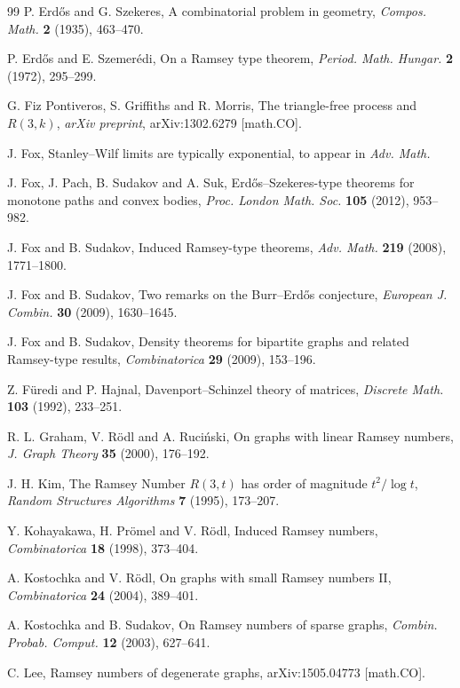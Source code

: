 \documentclass[11pt]{article}
\begin{document}
\begin{thebibliography}{99}
P. Erd\H{o}s and G. Szekeres, A combinatorial problem in geometry, {\it Compos. Math.} {\bf 2} (1935), 463--470.

{P. Erd\H{o}s and E. Szemer\'edi,} {On a Ramsey type theorem,} {\it Period. Math. Hungar.} {\bf 2} (1972), 295--299.

{G. Fiz Pontiveros, S. Griffiths and R. Morris,} {The triangle-free process and $R(3,k)$,} {\it arXiv preprint}, arXiv:1302.6279 [math.CO].

J. Fox, Stanley--Wilf limits are typically exponential, to appear in {\it Adv. Math.}

 J. Fox, J. Pach, B. Sudakov and A. Suk, Erd\H{o}s--Szekeres-type theorems for monotone paths and convex bodies,  {\it Proc. London Math. Soc.} {\bf 105} (2012), 953--982. 

J. Fox and B. Sudakov, Induced Ramsey-type theorems, {\it Adv. Math.} {\bf 219} (2008), 1771--1800.

J. Fox and B. Sudakov, Two remarks on the Burr--Erd\H{o}s conjecture, {\it European J. Combin.} {\bf 30} (2009), 1630--1645.

J. Fox and B. Sudakov, Density theorems for bipartite graphs and related Ramsey-type results,  {\it Combinatorica} {\bf 29} (2009), 153--196.

{Z. F\"uredi and P. Hajnal,} {Davenport--Schinzel theory of matrices,} {\it Discrete Math.} {\bf 103} (1992), 233--251.

R. L. Graham,  V. R\"odl and A. Ruci\'nski, On graphs with linear Ramsey numbers, {\it J. Graph Theory} {\bf 35} (2000), 176--192. 

{J. H. Kim,} {The Ramsey Number $R(3,t)$ has order of magnitude $t^2/\log t$,} {\it Random Structures Algorithms} {\bf 7} (1995), 173--207.

{Y. Kohayakawa, H. Pr\"omel and V. R\"odl,} {Induced Ramsey numbers,} {\it Combinatorica} {\bf 18} (1998), 373--404.

{A. Kostochka and V. R\"odl,} {On graphs with small Ramsey numbers II,} {\it Combinatorica} {\bf 24} (2004), 389--401.

{A. Kostochka and B. Sudakov,} {On Ramsey numbers of sparse graphs,} {\it Combin. Probab. Comput.} {\bf 12} (2003), 627--641.

{C. Lee,} {Ramsey numbers of degenerate graphs,} {arXiv:1505.04773 [math.CO]}.


\end{thebibliography}
\end{document}
